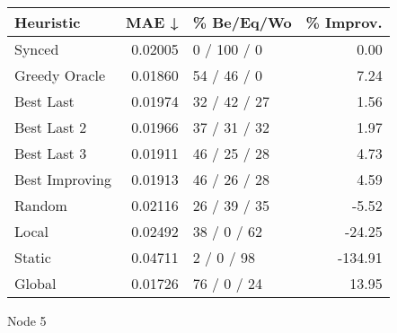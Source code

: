 \begin{tabular}{lrlr}
\toprule
\textbf{Heuristic} & \textbf{MAE ↓} & \textbf{\% Be/Eq/Wo} & \textbf{\% Improv.} \\
\midrule
            Synced &        0.02005 &          0 / 100 / 0 &                0.00 \\
     Greedy Oracle &        0.01860 &          54 / 46 / 0 &                7.24 \\
         Best Last &        0.01974 &         32 / 42 / 27 &                1.56 \\
       Best Last 2 &        0.01966 &         37 / 31 / 32 &                1.97 \\
       Best Last 3 &        0.01911 &         46 / 25 / 28 &                4.73 \\
    Best Improving &        0.01913 &         46 / 26 / 28 &                4.59 \\
            Random &        0.02116 &         26 / 39 / 35 &               -5.52 \\
             Local &        0.02492 &          38 / 0 / 62 &              -24.25 \\
            Static &        0.04711 &           2 / 0 / 98 &             -134.91 \\
            Global &        0.01726 &          76 / 0 / 24 &               13.95 \\
\bottomrule
\end{tabular}
\caption{Node 5}
\label{tab:non_lr05_le2_bs2_5}
